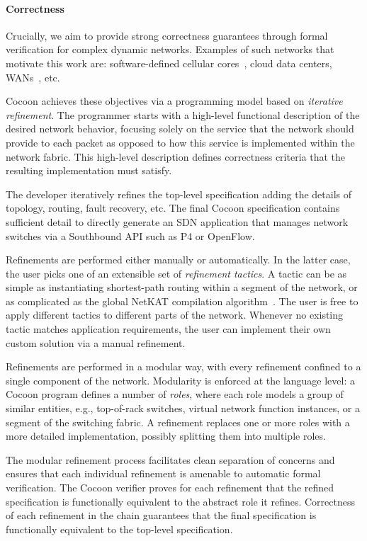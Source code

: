 \documentclass[letterpaper,10pt,twocolumn]{article}
\begin{document}
\paragraph{Correctness} Crucially, we aim to provide strong 
correctness guarantees through formal verification for complex 
dynamic networks.  Examples of such networks that motivate this 
work are: software-defined cellular cores~\cite{Jin_LVR_13}, cloud 
data centers, WANs~\cite{Jain_KMOPSVWZZZHSV_13}, etc.

\vspace{2mm}

Cocoon achieves these objectives via a programming model based on 
\emph{iterative refinement}.  The programmer starts with a 
high-level functional description of the desired network behavior, 
focusing solely on the service that the network should provide to 
each packet as opposed to how this service is implemented within 
the network fabric.  This high-level description defines 
correctness criteria that the resulting implementation must 
satisfy.

The developer iteratively refines the top-level specification 
adding the details of topology, routing, fault recovery, etc.  The 
final Cocoon specification contains sufficient detail to directly 
generate an SDN application that manages network switches via a 
Southbound API such as P4 or OpenFlow.  

Refinements are performed either manually or automatically.  In 
the latter case, the user picks one of an extensible set of 
\emph{refinement tactics}.  A tactic can be as simple as 
instantiating shortest-path routing within a segment of the 
network, or as complicated as the global NetKAT compilation 
algorithm~\cite{Smolka_EFG_15}.  The user is free to apply 
different tactics to different parts of the network.  Whenever no 
existing tactic matches application requirements, the user can 
implement their own custom solution via a manual refinement.

Refinements are performed in a modular way, with every refinement 
confined to a single component of the network.  Modularity is 
enforced at the language level: a Cocoon program defines a number 
of \emph{roles}, where each role models a group of similar 
entities, e.g., top-of-rack switches, virtual network function 
instances, or a segment of the switching fabric.  A refinement 
replaces one or more roles with a more detailed implementation, 
possibly splitting them into multiple roles.  

The modular refinement process facilitates clean separation of 
concerns and ensures that each individual refinement is amenable 
to automatic formal verification.  The Cocoon verifier proves for 
each refinement that the refined specification is functionally 
equivalent to the abstract role it refines.  Correctness of each 
refinement in the chain guarantees that the final specification is 
functionally equivalent to the top-level specification.  
\end{document}

